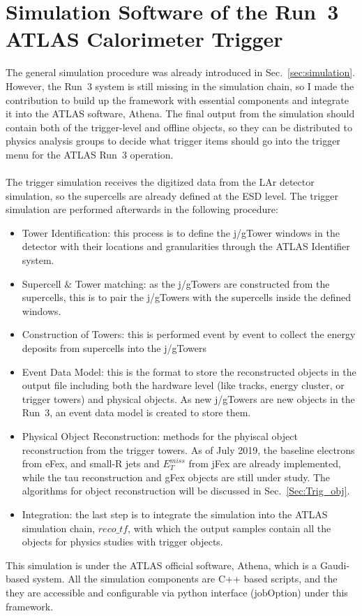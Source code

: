 \section{Simulation Software of the Run~3 ATLAS Calorimeter Trigger}
The general simulation procedure was already introduced in Sec.~\ref{sec:simulation}. However, the Run~3 system is still missing in the simulation chain, so I made the contribution to build up the framework with essential components and integrate it into the ATLAS software, Athena. The final output from the simulation should contain both of the trigger-level and offline objects, so they can be distributed to physics analysis groups to decide what trigger items should go into the trigger menu for the ATLAS Run~3 operation. 
\\
\\The trigger simulation receives the digitized data from the LAr detector simulation, so the supercells are already defined at the ESD level. The trigger simulation are performed afterwards in the following procedure:
\begin{itemize}
	\item Tower Identification: this process is to define the j/gTower windows in the detector with their locations and granularities through the ATLAS Identifier system.
	\item Supercell $\&$ Tower matching: as the j/gTowers are constructed from the supercells, this is to pair the j/gTowers with the supercells inside the defined windows.
	\item Construction of Towers: this is performed event by event to collect the energy deposits from supercells into the j/gTowers
	\item Event Data Model: this is the format to store the reconstructed objects in the output file including both the hardware level (like tracks, energy cluster, or trigger towers) and physical objects. As new j/gTowers are new objects in the Run~3, an event data model is created to store them.
	\item Physical Object Reconstruction: methods for the phyiscal object reconstruction from the trigger towers. As of July 2019, the baseline electrons from eFex, and small-R jets and $E^{miss}_{T}$ from jFex are already implemented, while the tau reconstruction and gFex objects are still under study. The algorithms for object reconstruction will be discussed in Sec.~\ref{Sec:Trig_obj}. 
	\item Integration: the last step is to integrate the simulation into the ATLAS simulation chain, $reco\_tf$\cite{Stewart:2014ida}, with which the output samples contain all the objects for physics studies with trigger objects. 
\end{itemize}
\noindent
This simulation is under the ATLAS official software, Athena, which is a Gaudi-based system\cite{Mato:2010zz}. All the simulation components are C++ based scripts, and the they are accessible and configurable via python interface (jobOption) under this framework.
